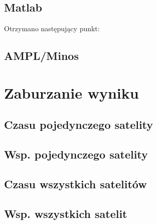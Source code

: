 \documentclass[]{article}
\begin{document}
\subsection{Matlab}
Otrzymano następujący punkt:
\subsection{AMPL/Minos}
\section{Zaburzanie wyniku}
\subsection{Czasu pojedynczego satelity}
\subsection{Wsp. pojedynczego satelity}
\subsection{Czasu wszystkich satelitów}
\subsection{Wsp. wszystkich satelit}
\end{document}
